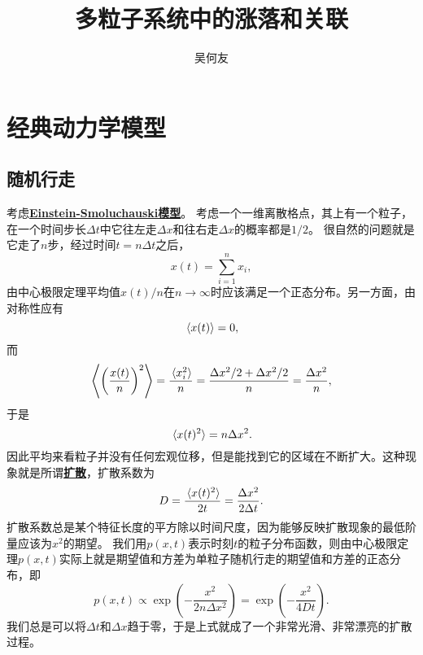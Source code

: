 \documentclass[hyperref, UTF8, a4paper]{ctexart}
\title{多粒子系统中的涨落和关联}
\author{吴何友}
\newcommand{\concept}[1]{\underline{\textbf{#1}}}
\begin{document}
\maketitle

\section{经典动力学模型}

\subsection{随机行走}

考虑\concept{Einstein-Smoluchauski模型}。 %
考虑一个一维离散格点，其上有一个粒子，在一个时间步长$\Delta t$中它往左走$\Delta x$和往右走$\Delta x$的概率都是$1/2$。
很自然的问题就是它走了$n$步，经过时间$t=n \Delta t$之后，
\[
    x(t) = \sum_{i=1}^n x_i,
\]
由中心极限定理平均值$x(t)/n$在$n \to \infty$时应该满足一个正态分布。另一方面，由对称性应有
\begin{equation}
    \expval*{x(t)} = 0,
\end{equation}
而
\[
    \expval{\left( \frac{x(t)}{n} \right)^2} = \frac{\expval*{x_i^2}}{n} = \frac{\Delta x^2 / 2 + \Delta x^2 / 2}{n} = \frac{\Delta x^2}{n},
\]
于是
\begin{equation}
    \expval*{x(t)^2} = n \Delta x^2.
\end{equation}
因此平均来看粒子并没有任何宏观位移，但是能找到它的区域在不断扩大。这种现象就是所谓\concept{扩散}，扩散系数为
\begin{equation}
    D = \frac{\expval*{x(t)^2}}{2 t} = \frac{\Delta x^2}{2 \Delta t}.
\end{equation}
扩散系数总是某个特征长度的平方除以时间尺度，因为能够反映扩散现象的最低阶量应该为$x^2$的期望。
我们用$p(x, t)$表示时刻$t$的粒子分布函数，则由中心极限定理$p(x, t)$实际上就是期望值和方差为单粒子随机行走的期望值和方差的正态分布，即
\begin{equation}
    p(x, t) \propto \exp(-\frac{x^2}{2 n \Delta x^2}) = \exp(- \frac{x^2}{4 D t}).
\end{equation}
我们总是可以将$\Delta t$和$\Delta x$趋于零，于是上式就成了一个非常光滑、非常漂亮的扩散过程。
\end{document}
